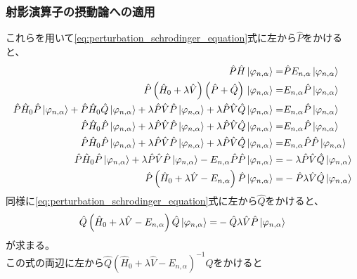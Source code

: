 \documentclass{ltjsarticle}
\begin{document}
\subsubsection{射影演算子の摂動論への適用}
これらを用いて\eqref{eq:perturbation_schrodinger_equation}式に左から$\hat{P}$をかけると、
\begin{align}
  \hat{P}\hat{H}\ket*{\varphi_{n,\alpha}}=&\hat{P}E_{n,\alpha}\ket*{\varphi_{n,\alpha}}\\
  \hat{P}\left( \hat{H}_0+\lambda\hat{V} \right) \left( \hat{P}+\hat{Q} \right) \ket*{\varphi_{n,\alpha}}=&E_{n,\alpha}\hat{P}\ket*{\varphi_{n,\alpha}}\\
  \hat{P}\hat{H}_0\hat{P}\ket*{\varphi_{n,\alpha}}+\hat{P}\hat{H}_0\hat{Q}\ket*{\varphi_{n,\alpha}}+\lambda\hat{P}\hat{V}\hat{P}\ket*{\varphi_{n,\alpha}}+\lambda\hat{P}\hat{V}\hat{Q}\ket*{\varphi_{n,\alpha}}=&E_{n,\alpha}\hat{P}\ket*{\varphi_{n,\alpha}}\\
  \hat{P}\hat{H}_0\hat{P}\ket*{\varphi_{n,\alpha}}+\lambda\hat{P}\hat{V}\hat{P}\ket*{\varphi_{n,\alpha}}+\lambda\hat{P}\hat{V}\hat{Q}\ket*{\varphi_{n,\alpha}}=&E_{n,\alpha}\hat{P}\ket*{\varphi_{n,\alpha}}\\
  \hat{P}\hat{H}_0\hat{P}\ket*{\varphi_{n,\alpha}}+\lambda\hat{P}\hat{V}\hat{P}\ket*{\varphi_{n,\alpha}}+\lambda\hat{P}\hat{V}\hat{Q}\ket*{\varphi_{n,\alpha}}=&E_{n,\alpha}\hat{P}\hat{P}\ket*{\varphi_{n,\alpha}}\\
  \hat{P}\hat{H}_0\hat{P}\ket*{\varphi_{n,\alpha}}+\lambda\hat{P}\hat{V}\hat{P}\ket*{\varphi_{n,\alpha}}-E_{n,\alpha}\hat{P}\hat{P}\ket*{\varphi_{n,\alpha}}=&-\lambda\hat{P}\hat{V}\hat{Q}\ket*{\varphi_{n,\alpha}}\\
  \hat{P}\left( \hat{H}_0+\lambda\hat{V}-E_{n,\alpha} \right)\hat{P}\ket*{\varphi_{n,\alpha}}=&-\hat{P}\lambda\hat{V}\hat{Q}\ket*{\varphi_{n,\alpha}}
  \label{eq:perturbation_p}
\end{align}
同様に\eqref{eq:perturbation_schrodinger_equation}式に左から$\hat{Q}$をかけると、
\begin{align}
  \hat{Q}\left( \hat{H}_0+\lambda\hat{V}-E_{n,\alpha} \right)\hat{Q}\ket*{\varphi_{n,\alpha}}=&-\hat{Q}\lambda\hat{V}\hat{P}\ket*{\varphi_{n,\alpha}}\\
\end{align}
が求まる。\\
この式の両辺に左から$\hat{Q}\left( \hat{H}_0+\lambda \hat{V}-E_{n,\alpha} \right)^{-1}\hat{Q} $をかけると
\end{document}

